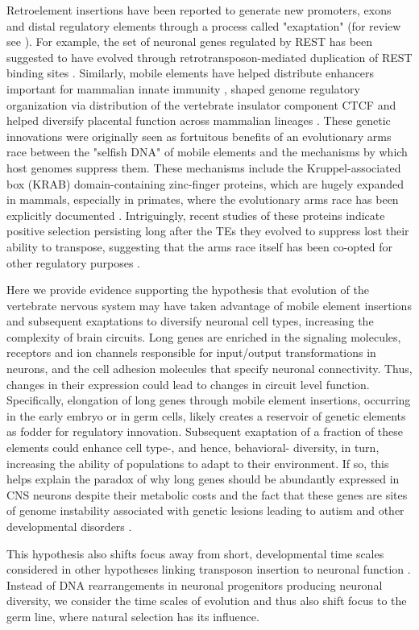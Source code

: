 Retroelement insertions have been reported to generate new promoters, exons and distal regulatory elements through a process called "exaptation" (for review see \cite{Chuong_2016}). For example, the set of neuronal genes regulated by REST has been suggested to have evolved through retrotransposon-mediated duplication of REST binding sites \cite{Johnson_2006}. Similarly, mobile elements have helped distribute enhancers important for mammalian innate immunity \cite{Chuong_2016a}, shaped genome regulatory organization via distribution of the vertebrate insulator component CTCF \cite{Schmidt_2012} and helped diversify placental function across mammalian lineages \cite{Chuong_2013}. These genetic innovations were originally seen as fortuitous benefits of an evolutionary arms race between the "selfish DNA" of mobile elements and the mechanisms by which host genomes suppress them. These mechanisms include the Kruppel-associated box (KRAB) domain-containing zinc-finger proteins, which are hugely expanded in mammals, especially in primates, where the evolutionary arms race has been explicitly documented \cite{Jacobs_2014}. Intriguingly, recent studies of these proteins indicate positive selection persisting long after the TEs they evolved to suppress lost their ability to transpose, suggesting that the arms race itself has been co-opted for other regulatory purposes \cite{Imbeault_2017}. 

Here we provide evidence supporting the hypothesis that evolution of the vertebrate nervous system may have taken advantage of mobile element insertions and subsequent exaptations to diversify neuronal cell types, increasing the complexity of brain circuits. Long genes are enriched in the signaling molecules, receptors and ion channels responsible for input/output transformations in neurons, and the cell adhesion molecules that specify neuronal connectivity. Thus, changes in their expression could lead to changes in circuit level function. Specifically, elongation of long genes through mobile element insertions, occurring in the early embryo or in germ cells, likely creates a reservoir of genetic elements as fodder for regulatory innovation. Subsequent exaptation of a fraction of these elements could enhance cell type-, and hence, behavioral- diversity, in turn, increasing the ability of populations to adapt to their environment. If so, this helps explain the paradox of why long genes should be abundantly expressed in CNS neurons despite their metabolic costs and the fact that these genes are sites of genome instability associated with genetic lesions leading to autism and other developmental disorders \citep{Wei_2016}. 

This hypothesis also shifts focus away from short, developmental time scales considered in other hypotheses linking transposon insertion to neuronal function \citep{Muotri_2005,Richardson_2014,Perrat_2013}. Instead of DNA rearrangements in neuronal progenitors producing neuronal diversity, we consider the time scales of evolution and thus also shift focus to the germ line, where natural selection has its influence. 



